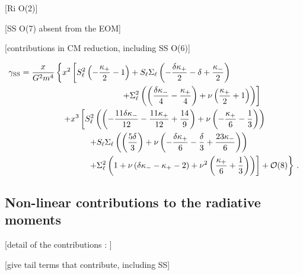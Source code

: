 \documentclass[
superscriptaddress,
preprint,
prd,tightenlines,showpacs,nofootinbib,
eqsecnum,
amsfonts,amsmath,amssymb]{revtex4-1}
\newcommand{\calO}{\mathcal{O}}
\newcommand{\nn}{\nonumber}
\begin{document}
[Ri O(2)]

[SS O(7) absent from the EOM]

[contributions in CM reduction, including SS O(6)]

\begin{align}\label{eq:gammacirc}
  \gamma_{\rm SS} &= \frac{x}{G^{2}m^{4}} \left\{ x^{2} 
    \left[ S_{\ell}^2 \left(-\frac{\kappa_{+}}{2}-1\right)  + 
      S_{\ell} \Sigma_{\ell} \left(-\frac{\delta  \kappa_{+}}{2}-\delta +
        \frac{\kappa_{-}}{2}\right) \right.\right. \nn \\
  & \qquad\qquad\qquad\qquad\qquad\qquad \left.\left. + 
      \Sigma_{\ell}^2 \left( \left(\frac{\delta  \kappa_{-}}{4} -
          \frac{\kappa_{+}}{4}\right)  + \nu \left(\frac{\kappa_{+}}{2} + 
          1\right) \right) \right] \right. \nn \\
  & \qquad\qquad\quad \left. + x^{3} \left[ S_{\ell}^2 \left( 
        \left(-\frac{11 \delta  \kappa_{-}}{12} - \frac{11 \kappa_{+}}{12} +
          \frac{14}{9}\right) + \nu \left(-\frac{\kappa_{+}}{6} - 
          \frac{1}{3}\right) \right) \right.\right. \nn \\
  & \qquad\qquad\qquad\qquad \left.\left. + 
      S_{\ell} \Sigma_{\ell} \left( \left(\frac{5 \delta }{3}\right) + 
        \nu \left(-\frac{\delta  \kappa_{+}}{6} - \frac{\delta }{3} +
          \frac{23 \kappa_{-}}{6}\right) \right) \right.\right. \nn \\
  & \qquad\qquad\qquad\qquad \left.\left. + 
      \Sigma_{\ell}^2 \left(1 + \nu \left(\delta  \kappa_{-} - \kappa_{+} - 
          2\right)  + \nu ^2 \left(\frac{\kappa_{+}}{6} +
          \frac{1}{3}\right) \right) \right] + \calO(8) \right\} \,.
\end{align}


\subsection{Non-linear contributions to the radiative moments}
\label{subsec:non-linear}

[detail of the contributions : ]

[give tail terms that contribute, including SS]
\end{document}
